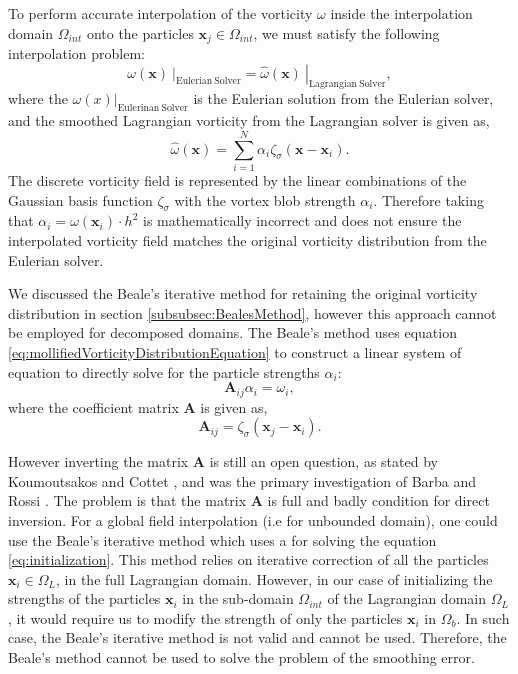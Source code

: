 To perform accurate interpolation of the vorticity $\omega$ inside the interpolation domain $\Omega_{int}$ onto the particles $\mathbf{x}_j \in \Omega_{int}$, we must satisfy the following interpolation problem:
	\begin{equation}
	\left. \omega(\mathbf{x})\  \right|_{\mathrm{Eulerian\ Solver}} = 
	\left. \hat{\omega}(\mathbf{x})\  \right|_{\mathrm{Lagrangian\ Solver}},
	\end{equation}
where the $\left. \omega(x) \right|_{\mathrm{Eulerinan\ Solver}}$ is the Eulerian solution from the Eulerian solver, and the smoothed Lagrangian vorticity from the Lagrangian solver is given as,
	\begin{equation}
	\hat{\omega}(\mathbf{x}) = \sum_{i=1}^{N} \alpha_i \zeta_{\sigma}(\mathbf{x} - \mathbf{x}_i).
	\label{eq:mollifiedVorticityDistributionEquation}
	\end{equation}
The discrete vorticity field is represented by the linear combinations of the Gaussian basis function $\zeta_{\sigma}$ with the vortex blob strength $\alpha_i$. Therefore taking that $\alpha_i = \omega(\mathbf{x}_i)\cdot{h^2}$ is mathematically incorrect and does not ensure the interpolated vorticity field matches the original vorticity distribution from the Eulerian solver.

We discussed the Beale's iterative method for retaining the original vorticity distribution in section \ref{subsubsec:BealesMethod}, however this approach cannot be employed for decomposed domains. The Beale's method uses equation \ref{eq:mollifiedVorticityDistributionEquation} to construct a linear system of equation to directly solve for the particle strengths $\alpha_i$:
\begin{equation}
\mathbf{A}_{ij}\alpha_i = \omega_i,
\end{equation}
where the coefficient matrix $\mathbf{A}$ is given as,
\begin{equation}
\mathbf{A}_{ij} = \zeta_{\sigma}(\mathbf{x}_j-\mathbf{x}_i).
\label{eq:initialization}
\end{equation}

However inverting the matrix $\mathbf{A}$ is still an open question, as stated by Koumoutsakos and Cottet \cite{Cottet2000a}, and was the primary investigation of Barba and Rossi \cite{Barba2010a}. The problem is that the matrix $\mathbf{A}$ is full and badly condition for direct inversion. For a global field interpolation (i.e for unbounded domain), one could use the Beale's iterative method which uses a  for solving the equation \ref{eq:initialization}. This method relies on iterative correction of all the particles $\mathbf{x}_i \in \Omega_L$, in the full Lagrangian domain. However, in our case of initializing the strengths of the particles $\mathbf{x}_i$ in the sub-domain $\Omega_{int}$ of the Lagrangian domain $\Omega_L$, it would require us to modify the strength of only the particles $\mathbf{x}_i$ in $\Omega_b$. In such case, the Beale's iterative method is not valid and cannot be used. Therefore, the Beale's method cannot be used to solve the problem of the smoothing error.

